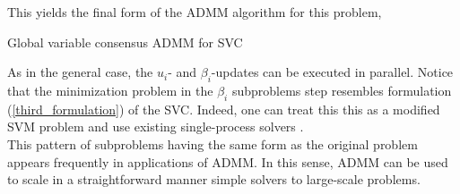 \documentclass[11pt]{article}
\begin{document}
This yields the final form of the ADMM algorithm for this problem, \\

\begin{algorithm}[H]
    \caption{Global variable consensus ADMM for SVC}

    \SetAlgoNoLine

\end{algorithm}



As in the general case, the $u_i$- and $\beta_i$-updates can be executed in parallel. Notice 
that the minimization problem in the $\beta_i$ subproblems step resembles formulation (\ref{third_formulation}) of the SVC. Indeed, one can treat this this as a modified SVM problem and 
use existing single-process solvers \cite{boydistributed}. \\
This pattern of subproblems having the same form as the original problem appears frequently in 
applications of ADMM. In this sense, ADMM can be used to scale in a straightforward manner simple 
solvers to large-scale problems.



\end{document}
